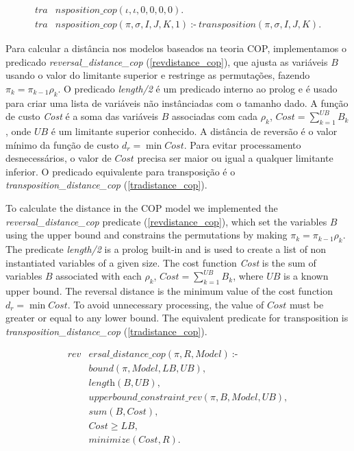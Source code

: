 \begin{align}
  \label{transposition_cop}
  \textit{tra}&\textit{nsposition\_cop}(\iota, \iota, 0, 0, 0, 0). \\
  \textit{tra}&\textit{nsposition\_cop}(\pi, \sigma, I, J, K, 1)~\text{:-}~ 
  \textit{transposition}(\pi, \sigma, I, J, K). \nonumber
\end{align}

Para calcular a distância nos modelos baseados na teoria COP,
implementamos o predicado \textit{reversal\_distance\_cop}
(\ref{revdistance_cop}), que ajusta as variáveis $B$ usando o valor do
limitante superior e restringe as permutações, fazendo $\pi_{k}
= \pi_{k-1} \rho_{k}$. O predicado \textit{length/2} é um predicado
interno ao prolog e é usado para criar uma lista de variáveis não
instânciadas com o tamanho dado. A função de custo \textit{Cost} é a
soma das variáveis $B$ associadas com cada $\rho_{k}$, $Cost
= \sum_{k=1}^{UB} B_{k}$, onde $UB$ é um limitante superior
conhecido. A distância de reversão é o valor mínimo da função de custo
$d_{r} = \min Cost$. Para evitar processamento desnecessários, o valor
de $Cost$ precisa ser maior ou igual a qualquer limitante inferior. O
predicado equivalente para transposição é
o \textit{transposition\_distance\_cop} (\ref{tradistance_cop}).

To calculate the distance in the COP model we implemented the
\textit{reversal\_distance\_cop} predicate (\ref{revdistance_cop}),
which set the variables $B$ using the upper bound and constrains the
permutations by making $\pi_{k} = \pi_{k-1} \rho_{k}$. The predicate
\textit{length/2} is a prolog built-in and is used to create a list of
non instantiated variables of a given size. The cost function
\textit{Cost} is the sum of variables $B$ associated with each
$\rho_{k}$, $Cost = \sum_{k=1}^{UB} B_{k}$, where $UB$ is a known
upper bound. The reversal distance is the minimum value of the cost
function $d_{r} = \min Cost$. To avoid unnecessary processing, the
value of $Cost$ must be greater or equal to any lower bound. The
equivalent predicate for transposition is
\textit{transposition\_distance\_cop} (\ref{tradistance_cop}).

\begin{align}
  \label{revdistance_cop}
  \textit{rev}&\textit{ersal\_distance\_cop}(\pi, R, Model)~\text{:-} \nonumber\\
  &\textit{bound}(\pi, Model, LB, UB), \nonumber\\
  &\textit{length}(B, UB), \nonumber \\
  &\textit{upperbound\_constraint\_rev}(\pi, B, Model, UB), \\
  &\textit{sum}(B, Cost), \nonumber \\
  &\textit{Cost} \ge \textit{LB}, \nonumber \\
  &\textit{minimize}(Cost, R). \nonumber
\end{align}

